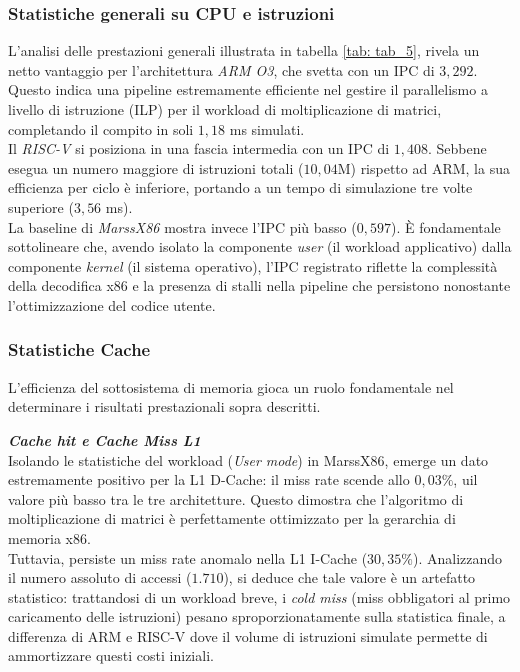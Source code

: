 \documentclass[../../main_document/main.tex]{subfiles}
\begin{document}
\subsubsection{Statistiche generali su CPU e istruzioni}

L'analisi delle prestazioni generali illustrata in tabella \ref{tab: tab_5}, rivela un netto vantaggio per l'architettura \textit{ARM O3}, che svetta con un IPC di $3,292$. Questo indica una pipeline estremamente efficiente nel gestire il parallelismo a livello di istruzione (ILP) per il workload di moltiplicazione di matrici, completando il compito in soli $1,18$ ms simulati.\\
Il \textit{RISC-V} si posiziona in una fascia intermedia con un IPC di $1,408$. Sebbene esegua un numero maggiore di istruzioni totali ($10,04$M) rispetto ad ARM, la sua efficienza per ciclo è inferiore, portando a un tempo di simulazione tre volte superiore ($3,56$ ms).\\
La baseline di \textit{MarssX86} mostra invece l'IPC più basso ($0,597$). È fondamentale sottolineare che, avendo isolato la componente \textit{user} (il workload applicativo) dalla componente \textit{kernel} (il sistema operativo), l'IPC registrato riflette la complessità della decodifica x86 e la presenza di stalli nella pipeline che persistono nonostante l'ottimizzazione del codice utente.

\subsubsection{Statistiche Cache}

L'efficienza del sottosistema di memoria gioca un ruolo fondamentale nel determinare i risultati prestazionali sopra descritti.

\vspace{8pt}
\noindent
\textbf{\textit{Cache hit e Cache Miss L1}}\\
Isolando le statistiche del workload (\textit{User mode}) in MarssX86, emerge un dato estremamente positivo per la L1 D-Cache: il miss rate scende allo $0,03\%$, uil valore più basso tra le tre architetture. Questo dimostra che l'algoritmo di moltiplicazione di matrici è perfettamente ottimizzato per la gerarchia di memoria x86. \\
Tuttavia, persiste un miss rate anomalo nella L1 I-Cache ($30,35\%$). Analizzando il numero assoluto di accessi ($1.710$), si deduce che tale valore è un artefatto statistico: trattandosi di un workload breve, i \textit{cold miss} (miss obbligatori al primo caricamento delle istruzioni) pesano sproporzionatamente sulla statistica finale, a differenza di ARM e RISC-V dove il volume di istruzioni simulate permette di ammortizzare questi costi iniziali.
\end{document}
